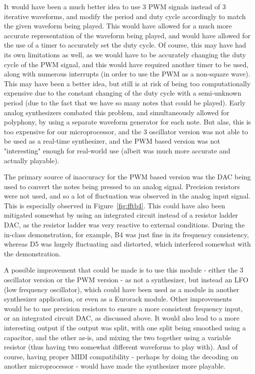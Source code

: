 \documentclass[12pt]{article}
\begin{document}
It would have been a much better idea to use 3 PWM signals instead of 3 iterative waveforms, and modify the period and duty cycle accordingly to match the given waveform being played.
This would have allowed for a much more accurate representation of the waveform being played, and would have allowed for the use of a timer to accurately set the duty cycle.
Of course, this may have had its own limitations as well, as we would have to be accurately changing the duty cycle of the PWM signal, and this would have required another timer to be used, along with numerous interrupts (in order to use the PWM as a non-square wave).
This may have been a better idea, but still is at risk of being too computationally expensive due to the constant changing of the duty cycle with a semi-unknown period (due to the fact that we have so many notes that could be played). 
Early analog synthesizers combated this problem, and simultaneously allowed for polyphony, by using a separate waveform generator for each note.
But alas, this is too expensive for our microprocessor, and the 3 oscillator version was not able to be used as a real-time synthesizer, and the PWM based version was not "interesting" enough for real-world use (albeit was much more accurate and actually playable).

The primary source of inaccuracy for the PWM based version was the DAC being used to convert the notes being pressed to an analog signal.
Precision resistors were not used, and so a lot of fluctuation was observed in the analog input signal.
This is especially observed in Figure~\ref{fig:fftb4}. 
This could have also been mitigated somewhat by using an integrated circuit instead of a resistor ladder DAC, as the resistor ladder was very reactive to external conditions. During the in-class demonstration, for example, B4 was just fine in its frequency consistency, whereas D5 was hugely fluctuating and distorted, which interfered somewhat with the demonstration. 

A possible improvement that could be made is to use this module - either the 3 oscillator version or the PWM version - as not a synthesizer, but instead an LFO (low frequency oscillator), which could have been used as a module in another synthesizer application, or even as a Eurorack module. Other improvements would be to use precision resistors to ensure a more consistent frequency input, or an integrated circuit DAC, as discussed above. It would also lead to a more interesting output if the output was split, with one split being smoothed using a capacitor, and the other as-is, and mixing the two together using a variable resistor (thus having two somewhat different waveforms to play with). And of course, having proper MIDI compatibility - perhaps by doing the decoding on another microprocessor - would have made the synthesizer more playable. 
\end{document}
